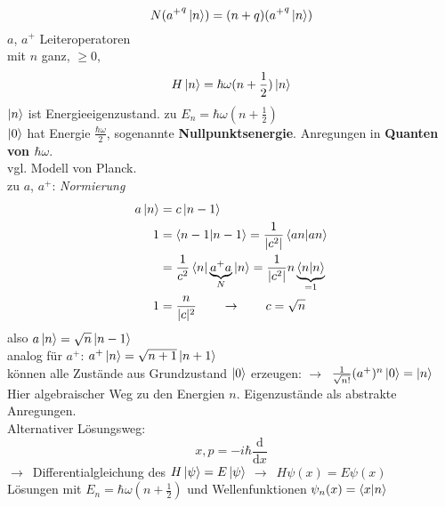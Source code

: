 \documentclass[oneside]{book}
\theoremstyle{definition}
\newcommand{\conseq}{$\rightarrow$~}
\renewcommand{\d}{\mathrm d}
\newcommand{\dd}[1]{\frac{\d}{\d #1}}
\begin{document}
$$N ({a^+}^q \ket{n}) = (n + q) ({a^+}^q \ket{n})$$
$a$, $a^+$ Leiteroperatoren\\
mit $n$ ganz, $\geq 0$,
$$H \ket{n} = \hbar \omega (n +\frac12) \ket{n}$$
$\ket{n}$ ist Energieeigenzustand.
zu $E_n = \hbar \omega (n + \frac12)$\\
$\ket{0}$ hat Energie $\frac{\hbar \omega}{2}$, sogenannte \textbf{Nullpunktsenergie}.
Anregungen in \textbf{Quanten von $\hbar \omega$}.\\
vgl. Modell von Planck.\\
zu $a$, $a^+$: \textit{Normierung}
\begin{align*}
a \ket{n} &= c \ket{n - 1}\\
1 &= \braket{n - 1 | n - 1} = \frac{1}{|c^2|} \braket{a n | a n}\\
&= \frac{1}{c^2} \braket{n | \underbrace{a^+ a}_N | n} = \frac{1}{|c^2|} n \underbrace{\braket{n | n}}_{= 1}\\
1 &= \frac{n}{|c|^2} \qquad \rightarrow \qquad c = \sqrt{n}
\end{align*}
also $a \ket{n} = \sqrt{n} \ket{n - 1}$\\
analog für $a^+$: $a^+ \ket{n} = \sqrt{n + 1} \ket{n + 1}$\\
können alle Zustände aus Grundzustand $\ket{0}$ erzeugen: \conseq $\frac{1}{\sqrt{n!}} (a^+)^n \ket{0} = \ket{n}$\\
Hier algebraischer Weg zu den Energien $n$. Eigenzustände als abstrakte Anregungen.\\
Alternativer Lösungsweg:
$$x, p = - i \hbar \dd{x}$$
\conseq Differentialgleichung des $H \ket{\psi} = E \ket{\psi}$ \conseq $H \psi(x) = E \psi(x)$\\
Lösungen mit $E_n = \hbar \omega (n + \frac12)$ und Wellenfunktionen $\psi_n(x) = \braket{x | n}$
\end{document}
